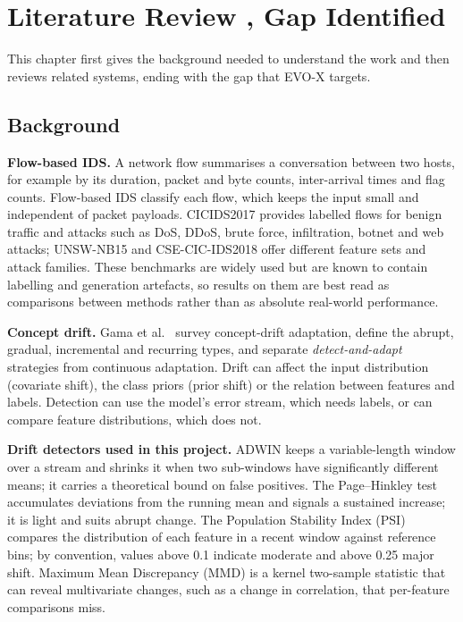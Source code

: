 \documentclass{article}
\begin{document}
	\pagebreak

	\section{Literature Review , Gap Identified}

This chapter first gives the background needed to understand the work and then reviews related systems, ending with the gap that EVO-X targets.

\subsection{Background}

\textbf{Flow-based IDS.} A network flow summarises a conversation between two hosts, for example by its duration, packet and byte counts, inter-arrival times and flag counts. Flow-based IDS classify each flow, which keeps the input small and independent of packet payloads. CICIDS2017 \cite{sharafaldin2018cicids} provides labelled flows for benign traffic and attacks such as DoS, DDoS, brute force, infiltration, botnet and web attacks; UNSW-NB15 \cite{moustafa2015unsw} and CSE-CIC-IDS2018 \cite{cse2018} offer different feature sets and attack families. These benchmarks are widely used but are known to contain labelling and generation artefacts, so results on them are best read as comparisons between methods rather than as absolute real-world performance.

\textbf{Concept drift.} Gama et al.\ \cite{gama2014survey} survey concept-drift adaptation, define the abrupt, gradual, incremental and recurring types, and separate \emph{detect-and-adapt} strategies from continuous adaptation. Drift can affect the input distribution (covariate shift), the class priors (prior shift) or the relation between features and labels. Detection can use the model's error stream, which needs labels, or can compare feature distributions, which does not.

\textbf{Drift detectors used in this project.} ADWIN \cite{bifet2007adwin} keeps a variable-length window over a stream and shrinks it when two sub-windows have significantly different means; it carries a theoretical bound on false positives. The Page--Hinkley test \cite{page1954ph} accumulates deviations from the running mean and signals a sustained increase; it is light and suits abrupt change. The Population Stability Index (PSI) compares the distribution of each feature in a recent window against reference bins; by convention, values above 0.1 indicate moderate and above 0.25 major shift. Maximum Mean Discrepancy (MMD) \cite{gretton2012mmd} is a kernel two-sample statistic that can reveal multivariate changes, such as a change in correlation, that per-feature comparisons miss.
\end{document}
